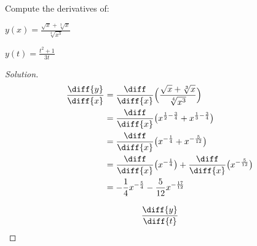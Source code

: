 \documentclass[crop=false,class=book,oneside]{standalone}
\begin{document}
            \begin{problem}
                Compute the derivatives of:
                \begin{enumerate}[label=(\alph*)]
                    \begin{multicols}{2}
                        \item $y(x)=\frac{\sqrt{x}+\sqrt[3]{x}}%
                                         {\sqrt[4]{x^{3}}}$
                        \item $y(t)=\frac{t^{2}+1}{3t}$
                    \end{multicols}
                \end{enumerate}
            \end{problem}
            \begin{proof}[Solution]
                \par\hfill\par
                \begin{minipage}[b]{.49\textwidth}
                    \centering
                    \begin{align*}
                        \frac{\diff{y}}{\diff{x}}
                        &=\frac{\diff}{\diff{x}}\Big(
                            \frac{\sqrt{x}+\sqrt[3]{x}}
                                 {\sqrt[4]{x^{3}}}\Big)\\
                        &=\frac{\diff}{\diff{x}}\big(
                                x^{\frac{1}{2}-\frac{3}{4}}+
                                x^{\frac{1}{3}-\frac{3}{4}}\big)\\
                        &=\frac{\diff}{\diff{x}}\big(
                                x^{-\frac{1}{4}}+
                                x^{-\frac{5}{12}}\big)\\
                        &=\frac{\diff}{\diff{x}}\big(
                                x^{-\frac{1}{4}}\big)+
                                \frac{\diff}{\diff{x}}
                                \big(x^{-\frac{5}{12}}\big)\\
                        &=-\frac{1}{4}x^{-\frac{5}{4}}-
                            \frac{5}{12}x^{-\frac{17}{12}}
                    \end{align*}
                \end{minipage}
                \hfill
                \vline
                \begin{minipage}[b]{.49\textwidth}
                    \centering
                    \begin{align*}
                        \frac{\diff{y}}{\diff{t}}

\end{align*}
\end{minipage}
\end{proof}
\end{document}
